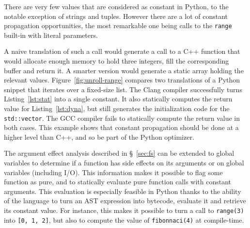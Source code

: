 \documentclass[10pt, preprint]{sigplanconf}
\begin{document}
There are very few values that are considered as constant in Python, to the
notable exception of strings and tuples. However there are a lot of constant
propagation opportunities, the most remarkable one being calls to the
\texttt{range} built-in with literal parameters.

A naive translation of such a call would generate a
call to a C++ function that would allocate enough memory to hold three integers,
fill the corresponding buffer and return it. A smarter version would generate a
static array holding the relevant values. Figure~\ref{fig:unroll-range}
compares two translations of a Python snippet that iterates over a fixed-size
list. The Clang compiler successfully turns Listing~\ref{lst:stat} into a
single constant. It also statically computes the return value for
Listing~\ref{lst:dyna}, but still generates the initialization code for the
\texttt{std::vector}. The GCC compiler fails to statically compute the return
value in both cases. This example shows that constant propagation should be
done at a higher level than C++, and so be part of the Python optimizer.

The argument effect analysis described in \S~\ref{sec:fs} can be extended to
global variables to determine if a function has side effects on its arguments or
on global variables (including I/O). This information makes it possible to flag
some function as pure, and to statically evaluate pure function calls with
constant arguments. This evaluation is especially feasible in Python thanks to
the ability of the language to turn an AST expression into bytecode, evaluate it
and retrieve its constant value. For instance, this makes it possible to turn a
call to \texttt{range(3)} into \texttt{[0, 1, 2]}, but also to compute the
value of \texttt{fibonnaci(4)} at compile-time.
\end{document}
